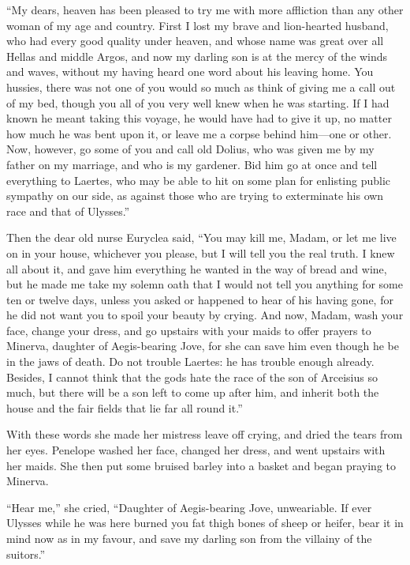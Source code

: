 “My dears, heaven has been pleased to try me with more affliction than any
other woman of my age and country. First I lost my brave and lion-hearted
husband, who had every good quality under heaven, and whose name was great over
all Hellas and middle Argos, and now my darling son is at the mercy of the
winds and waves, without my having heard one word about his leaving home. You
hussies, there was not one of you would so much as think of giving me a call
out of my bed, though you all of you very well knew when he was starting. If I
had known he meant taking this voyage, he would have had to give it up, no
matter how much he was bent upon it, or leave me a corpse behind him—one or
other. Now, however, go some of you and call old Dolius, who was given me by my
father on my marriage, and who is my gardener. Bid him go at once and tell
everything to Laertes, who may be able to hit on some plan for enlisting public
sympathy on our side, as against those who are trying to exterminate his own
race and that of Ulysses.”

Then the dear old nurse Euryclea said, “You may kill me, Madam, or let me live
on in your house, whichever you please, but I will tell you the real truth. I
knew all about it, and gave him everything he wanted in the way of bread and
wine, but he made me take my solemn oath that I would not tell you anything for
some ten or twelve days, unless you asked or happened to hear of his having
gone, for he did not want you to spoil your beauty by crying. And now, Madam,
wash your face, change your dress, and go upstairs with your maids to offer
prayers to Minerva, daughter of Aegis-bearing Jove, for she can save him even
though he be in the jaws of death. Do not trouble Laertes: he has trouble
enough already. Besides, I cannot think that the gods hate the race of the son
of Arceisius so much, but there will be a son left to come up after him, and
inherit both the house and the fair fields that lie far all round it.”

With these words she made her mistress leave off crying, and dried the tears
from her eyes. Penelope washed her face, changed her dress, and went upstairs
with her maids. She then put some bruised barley into a basket and began
praying to Minerva.

“Hear me,” she cried, “Daughter of Aegis-bearing Jove, unweariable. If ever
Ulysses while he was here burned you fat thigh bones of sheep or heifer, bear
it in mind now as in my favour, and save my darling son from the villainy of
the suitors.”

